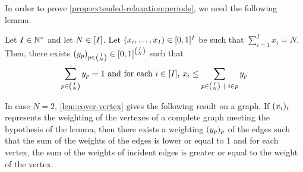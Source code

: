 In order to prove \cref{prop:extended-relaxation:periods}, we need the following lemma.

\begin{lem}\label{lem:cover-vertex}
Let $I\in\mathbb{N}^*$ and let $N\in\range{I}$.
Let $\bracket{x_i,\ldots,x_I}\in\sqbracket{0,1}^I$ be such that $\sum_{i=1}^I x_i = N$.
Then, there exists $\bracket{y_p}_{p\in{I\choose N}}\in\sqbracket{0,1}^{I\choose N}$ such that
\begin{equation}
  \sum_{p\in{I\choose N}}y_p = 1
  \ \mbox{and for each $i\in\range{I}$,}\ 
  x_i \le \sum_{p\in{I\choose N}~|~i\in p}y_p
\end{equation}
\end{lem}


\begin{rmq}
In case $N=2$, \cref{lem:cover-vertex} gives the following result on a graph. If $\bracket{x_i}_i$ represents the weighting of the vertexes of a complete graph meeting the hypothesis of the lemma, then there exists a weighting $\bracket{y_p}_p$ of the edges such that the sum of the weights of the edges is lower or equal to 1 and for each vertex, the sum of the weights of incident edges is greater or equal to the weight of the vertex.
\end{rmq}




